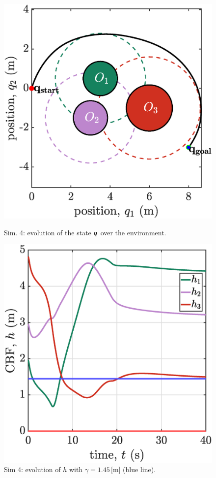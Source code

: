 \begin{figure}[!ht]
    \begin{minipage}[b]{0.46\linewidth}
    \includegraphics[width=\textwidth]{figures/sim4map.eps}
    \caption{\label{fig:sim4map}Sim. 4: evolution of the state ${\boldsymbol{q}}$ over the environment.}
    \end{minipage}
    \hfill
    \begin{minipage}[b]{0.46\linewidth}
    \includegraphics[width=\textwidth]{figures/sim4h.eps}
    \caption{\label{fig:sim4h}Sim 4: evolution of $h$ with $\gamma = 1.45\,[\mathrm{m}$] (blue line).}
    \end{minipage}
\end{figure}

